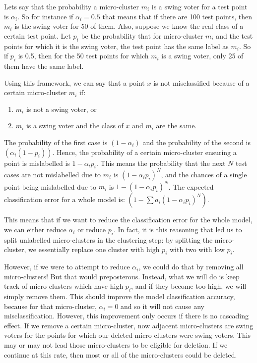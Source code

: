 \documentclass[12pt,a4paper,oneside]{report}
\begin{document}
Lets say that the probability a micro-cluster $m_i$ is a swing voter for a test point is $\alpha_i$. So for instance if $\alpha_i = 0.5$ that means that if there are 100 test points, then $m_i$ is the swing voter for 50 of them. Also, suppose we know the real class of a certain test point. Let $p_i$ be the probability that for micro-cluster $m_i$ and the test points for which it is the swing voter, the test point has the same label as $m_i$. So if $p_i$ is 0.5, then for the 50 test points for which $m_i$ is a swing voter, only 25 of them have the same label. 

Using this framework, we can say that a point $x$ is not misclassified because of a certain micro-cluster $m_i$ if:
\begin{enumerate}
\item $m_i$ is not a swing voter, or
\item $m_i$ is a swing voter and the class of $x$ and $m_i$ are the same.
\end{enumerate}

The probability of the first case is $(1-\alpha_i)$ and the probability of the second is $(\alpha_i(1-p_i))$. Hence, the probability of a certain micro-cluster ensuring a point is mislabelled is $1-\alpha_ip_i$. This means the probability that the next $N$ test cases are not mislabelled due to $m_i$ is $(1-\alpha_ip_i)^N$, and the chances of a single point being mislabelled due to $m_i$ is $1-(1-\alpha_ip_i)^N$. The expected classification error for a whole model is: $(1-\sum a_i(1-\alpha_ip_i)^N)$.

This means that if we want to reduce the classification error for the whole model, we can either reduce $\alpha_i$ or reduce $p_i$. In fact, it is this reasoning that led us to split unlabelled micro-clusters in the clustering step: by splitting the micro-cluster, we essentially replace one cluster with high $p_i$ with two with low $p_i$. 

However, if we were to attempt to reduce $\alpha_i$, we could do that by removing all micro-clusters! But that would preposterous. Instead, what we will do is keep track of micro-clusters which have high $p_i$, and if they become too high, we will simply remove them. This should improve the model classification accuracy, because for that micro-cluster, $\alpha_i = 0$ and so it will not cause any misclassification. However, this improvement only occurs if there is no cascading effect. If we remove a certain micro-cluster, now adjacent micro-clusters are swing voters for the points for which our deleted micro-clusters were swing voters. This may or may not lead those micro-clusters to be eligible for deletion. If we continue at this rate, then most or all of the micro-clusters could be deleted. 
\end{document}
